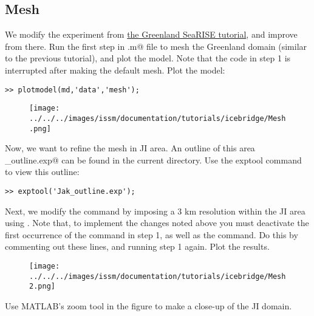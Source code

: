 \subsection{Mesh} %
We modify the experiment from \href{../greenland}{the Greenland SeaRISE tutorial}, and improve from there. Run the first step in \verb@runme.m@ file to mesh the Greenland domain (similar to the previous tutorial), and plot the model. Note that the code in step 1 is interrupted after making the default mesh. Plot the model:
\begin{verbatim}>> plotmodel(md,'data','mesh');\end{verbatim}
\begin{figure}[H]
	\begin{center}
		\texttt{[image: ../../../images/issm/documentation/tutorials/icebridge/Mesh.png]}
	\end{center}
\end{figure}
Now, we want to refine the mesh in JI area. An outline of this area \verb@Jak_outline.exp@ can be found in the current directory. Use the exptool command to view this outline:
\begin{verbatim}>> exptool('Jak_outline.exp');\end{verbatim}

Next, we modify the \verb@bamg@ command by imposing a 3 km resolution within the JI area using \verb@hmaxVertices@. Note that, to implement the changes noted above you must deactivate the first occurrence of the \verb@bamg@ command in step 1, as well as the \verb@return@ command. Do this by commenting out these lines, and running step 1 again. Plot the results.
\begin{figure}[H]
	\begin{center}
		\texttt{[image: ../../../images/issm/documentation/tutorials/icebridge/Mesh2.png]}
	\end{center}
\end{figure}
Use MATLAB's zoom tool in the figure to make a close-up of the JI domain.
